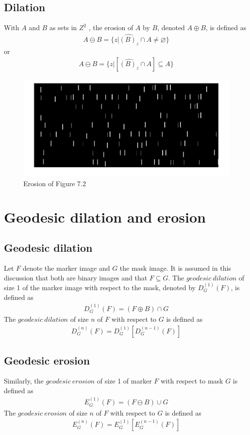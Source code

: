 \documentclass[11pt,oneside]{book}
\begin{document}
\subsection{Dilation}
With $A$ and $B$ as sets in $Z^2$ , the erosion of $A$ by $B$, denoted $A \oplus B$, is defined as
\begin{align}
  A \ominus B = \{z|\hat{(B)_z}\cap A\neq \varnothing\}
\end{align}
or
\begin{align}
  A \ominus B = \{z|[\hat{(B)_z}\cap A] \subseteq A\}
\end{align}
\begin{figure}[!htb]
   \centering  
   \includegraphics[width=1\textwidth]{images/8/image_di.jpg}
   \caption{Erosion of Figure 7.2}
\end{figure}

\section{Geodesic dilation and erosion}
\subsection{Geodesic dilation}
Let $F$ denote the marker image and $G$ the mask image. It is assumed in this discussion that both are binary images and that $F \subseteq G$. The $geodesic\ dilation$ of size 1 of the marker image with respect to the mask, denoted by $D_G^{(1)}(F)$, is defined as
\begin{align}
  D_G^{(1)}(F) = (F \oplus B)\cap G
\end{align}
The $geodesic\ dilation$ of size $n$ of $F$ with respect to $G$ is defined as
\begin{align}
  D_G^{(n)}(F) = D_G^{(1)}[D_G^{(n-1)}(F)]
\end{align}
\subsection{Geodesic erosion}
Similarly, the $geodesic\ erosion$ of size 1 of marker $F$ with respect to mask $G$ is defined as
\begin{align}
  E_G^{(1)}(F) = (F \ominus B)\cup G
\end{align}
The $geodesic\ erosion$ of size $n$ of $F$ with respect to $G$ is defined as
\begin{align}
  E_G^{(n)}(F) = E_G^{(1)}[E_G^{(n-1)}(F)]
\end{align}
\end{document}

